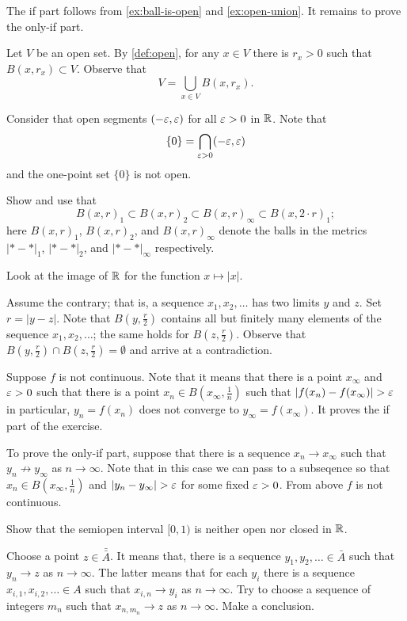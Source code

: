 \begin{multicols}{2}
 The if part follows from \ref{ex:ball-is-open} and \ref{ex:open-union}.
It remains to prove the only-if part.

Let $V$ be an open set. 
By \ref{def:open}, for any $x\in V$ there is $r_x>0$ such that $B(x,r_x)\subset V$.
Observe that
\[V=\bigcup_{x\in V} B(x,r_x).\]

Consider that open segments $(-\varepsilon,\varepsilon)$ for all $\varepsilon>0$ in $\mathbb{R}$.
Note that 
\[\{0\}=\bigcap_{\varepsilon>0}(-\varepsilon,\varepsilon)\]
and the one-point set $\{0\}$ is not open.

Show and use that 
\[B(x,r)_1\subset B(x,r)_2\subset B(x,r)_\infty\subset B(x,2\cdot r)_1;\]
here $B(x,r)_1$, $B(x,r)_2$, and $B(x,r)_\infty$ denote the balls in the metrics $|{*}-{*}|_1$, $|{*}-{*}|_2$, and $|{*}-{*}|_\infty$ respectively.

Look at the image of $\mathbb{R}$ for the function $x\mapsto |x|$.

Assume the contrary; that is, a sequence $x_1,x_2,\dots$ has two limits $y$ and $z$.
Set $r=|y-z|$.
Note that $B(y,\tfrac r2)$ contains all but finitely many elements of the sequence $x_1,x_2,\dots$;
the same holds for $B(z,\tfrac r2)$.
Observe that $B(y,\tfrac r2)\cap B(z,\tfrac r2)=\emptyset$ and arrive at a contradiction.

Suppose $f$ is not continuous.
Note that it means that there is a point $x_\infty$ and $\varepsilon>0$ such that there is a point $x_n\in B(x_\infty,\tfrac1n)$ such that $|f(x_n)-f(x_\infty)|>\eps$ in particular, $y_n=f(x_n)$ does not converge to $y_\infty=f(x_\infty)$. 
It proves the if part of the exercise.

To prove the only-if part, suppose that there is a sequence $x_n\to x_\infty$ such that $y_n\not\to y_\infty$ as $n\to \infty$.
Note that in this case we can pass to a subseqence so that $x_n\in B(x_\infty,\tfrac1n)$ and $|y_n-y_\infty|>\eps$ for some fixed $\varepsilon>0$.
From above $f$ is not continuous.

Show that the semiopen interval $[0,1)$ is neither open nor closed in $\mathbb{R}$.

Choose a point $z\in \bar{\bar A}$.
It means that, there is a sequence $y_1,y_2,\dots\in\bar A$ such that $y_n\to z$ as $n\to\infty$.
The latter means that for each $y_i$ there is a sequence $x_{i,1}, x_{i,2},\dots\in A$ such that $x_{i,n}\to y_i$ as $n\to\infty$.
Try to choose a sequence of integers $m_n$ such that $x_{n,m_n}\to z$ as $n\to\infty$.
Make a conclusion.


\end{multicols}
